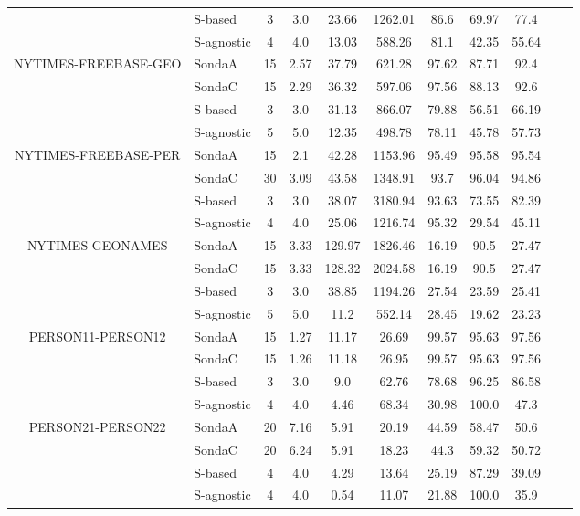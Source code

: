 \begin{center}
\begin{table}[h]
\begin{tabular}{|c|l|c|c|c|c|c|c|c|c|c|}
 & S-based  & 3 & 3.0   & 23.66  & 1262.01 & 86.6 & 69.97 & 77.4  \\
 & S-agnostic  & 4 & 4.0   & 13.03  & 588.26 & 81.1 & 42.35 & 55.64  \\ \hline
\multirow{4}{*}{NYTIMES-FREEBASE-GEO}  & SondaA  & 15 & 2.57   & 37.79  & 621.28 & 97.62 & 87.71 & 92.4  \\
 & SondaC  & 15 & 2.29   & 36.32  & 597.06 & 97.56 & 88.13 & 92.6  \\
 & S-based  & 3 & 3.0   & 31.13  & 866.07 & 79.88 & 56.51 & 66.19  \\
 & S-agnostic  & 5 & 5.0   & 12.35  & 498.78 & 78.11 & 45.78 & 57.73  \\ \hline
\multirow{4}{*}{NYTIMES-FREEBASE-PER}  & SondaA  & 15 & 2.1   & 42.28  & 1153.96 & 95.49 & 95.58 & 95.54  \\
 & SondaC  & 30 & 3.09   & 43.58  & 1348.91 & 93.7 & 96.04 & 94.86  \\
 & S-based  & 3 & 3.0   & 38.07  & 3180.94 & 93.63 & 73.55 & 82.39  \\
 & S-agnostic  & 4 & 4.0   & 25.06  & 1216.74 & 95.32 & 29.54 & 45.11  \\ \hline
\multirow{4}{*}{NYTIMES-GEONAMES}  & SondaA  & 15 & 3.33   & 129.97  & 1826.46 & 16.19 & 90.5 & 27.47  \\
 & SondaC  & 15 & 3.33   & 128.32  & 2024.58 & 16.19 & 90.5 & 27.47  \\
 & S-based  & 3 & 3.0   & 38.85  & 1194.26 & 27.54 & 23.59 & 25.41  \\
 & S-agnostic  & 5 & 5.0   & 11.2  & 552.14 & 28.45 & 19.62 & 23.23  \\ \hline
\multirow{4}{*}{PERSON11-PERSON12}  & SondaA  & 15 & 1.27   & 11.17  & 26.69 & 99.57 & 95.63 & 97.56  \\
 & SondaC  & 15 & 1.26   & 11.18  & 26.95 & 99.57 & 95.63 & 97.56  \\
 & S-based  & 3 & 3.0   & 9.0  & 62.76 & 78.68 & 96.25 & 86.58  \\
 & S-agnostic  & 4 & 4.0   & 4.46  & 68.34 & 30.98 & 100.0 & 47.3  \\ \hline
\multirow{4}{*}{PERSON21-PERSON22}  & SondaA  & 20 & 7.16   & 5.91  & 20.19 & 44.59 & 58.47 & 50.6  \\
 & SondaC  & 20 & 6.24   & 5.91  & 18.23 & 44.3 & 59.32 & 50.72  \\
 & S-based  & 4 & 4.0   & 4.29  & 13.64 & 25.19 & 87.29 & 39.09  \\
 & S-agnostic  & 4 & 4.0   & 0.54  & 11.07 & 21.88 & 100.0 & 35.9  \\ \hline

\end{tabular}
\end{table}
\end{center}
